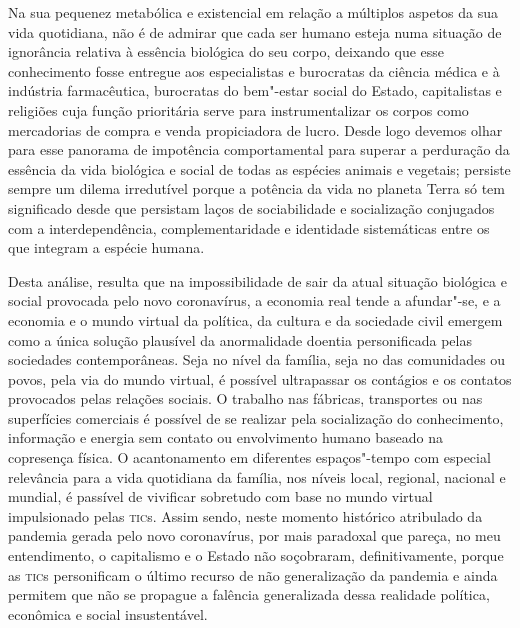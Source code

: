 Na sua pequenez metabólica e existencial em relação a múltiplos aspetos
da sua vida quotidiana, não é de admirar que cada ser humano esteja numa
situação de ignorância relativa à essência biológica do seu corpo,
deixando que esse conhecimento fosse entregue aos especialistas e
burocratas da ciência médica e à indústria farmacêutica, burocratas do
bem"-estar social do Estado, capitalistas e religiões cuja função
prioritária serve para instrumentalizar os corpos como mercadorias de
compra e venda propiciadora de lucro. Desde logo devemos olhar para esse
panorama de impotência comportamental para superar a perduração da
essência da vida biológica e social de todas as espécies animais e
vegetais; persiste sempre um dilema irredutível porque a potência da
vida no planeta Terra só tem significado desde que persistam laços de
sociabilidade e socialização conjugados com a interdependência,
complementaridade e identidade sistemáticas entre os que integram a
espécie humana.

Desta análise, resulta que na impossibilidade de sair da atual situação
biológica e social provocada pelo novo coronavírus, a economia real
tende a afundar"-se, e a economia e o mundo virtual da política, da
cultura e da sociedade civil emergem como a única solução plausível da
anormalidade doentia personificada pelas sociedades contemporâneas. Seja
no nível da família, seja no das comunidades ou povos, pela via do mundo
virtual, é possível ultrapassar os contágios e os contatos provocados
pelas relações sociais. O trabalho nas fábricas, transportes ou nas
superfícies comerciais é possível de se realizar pela socialização do
conhecimento, informação e energia sem contato ou envolvimento humano
baseado na copresença física. O acantonamento em diferentes
espaços"-tempo com especial relevância para a vida quotidiana da família,
nos níveis local, regional, nacional e mundial, é passível de vivificar
sobretudo com base no mundo virtual impulsionado pelas \textsc{tic}s. Assim
sendo, neste momento histórico atribulado da pandemia gerada pelo novo
coronavírus, por mais paradoxal que pareça, no meu entendimento, o
capitalismo e o Estado não soçobraram, definitivamente, porque as \textsc{tic}s
personificam o último recurso de não generalização da pandemia e ainda
permitem que não se propague a falência generalizada dessa realidade
política, econômica e social insustentável.

